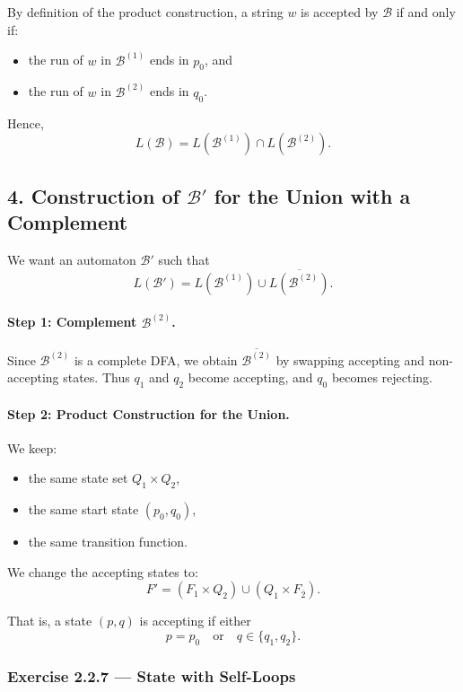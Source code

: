 \documentclass{article}
\theoremstyle{theorem}
\theoremstyle{definition}
\theoremstyle{remark}
\begin{document}
By definition of the product construction, a string $w$ is accepted by
$\mathcal B$ if and only if:

\begin{itemize}
    \item the run of $w$ in $\mathcal B^{(1)}$ ends in $p_0$, and
    \item the run of $w$ in $\mathcal B^{(2)}$ ends in $q_0$.
\end{itemize}

Hence,
\[
L(\mathcal B)
=
L(\mathcal B^{(1)})
\cap
L(\mathcal B^{(2)}).
\]

\bigskip

\subsection*{4. Construction of $\mathcal B'$ for the Union with a Complement}

We want an automaton $\mathcal B'$ such that
\[
L(\mathcal B')
=
L(\mathcal B^{(1)})
\cup
\overline{L(\mathcal B^{(2)})}.
\]

\paragraph{Step 1: Complement $\mathcal B^{(2)}$.}

Since $\mathcal B^{(2)}$ is a complete DFA, we obtain
$\overline{\mathcal B^{(2)}}$ by swapping accepting and non-accepting states.
Thus $q_1$ and $q_2$ become accepting, and $q_0$ becomes rejecting.

\paragraph{Step 2: Product Construction for the Union.}

We keep:

\begin{itemize}
    \item the same state set $Q_1 \times Q_2$,
    \item the same start state $(p_0,q_0)$,
    \item the same transition function.
\end{itemize}

We change the accepting states to:
\[
F'
=
(F_1 \times Q_2)
\cup
(Q_1 \times F_{\overline{2}}).
\]

That is, a state $(p,q)$ is accepting if either
\[
p = p_0
\quad \text{or} \quad
q \in \{q_1,q_2\}.
\]

\subsubsection*{Exercise 2.2.7 — State with Self-Loops}
\end{document}
